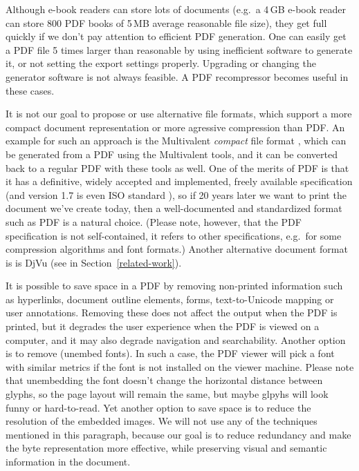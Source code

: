 \documentclass{ltugproc}
\begin{document}
Although e-book readers can store lots of documents (e.g.\ a 4\,GB e-book
reader can store 800 PDF books of 5\,MB average reasonable file size), they
get full quickly if we don't pay attention to efficient PDF generation. One
can easily get a PDF file 5 times larger than reasonable by using
inefficient software to generate it, or not setting the export settings
properly. Upgrading or changing the generator software is not always
feasible. A PDF recompressor becomes useful in these cases.

It is not our goal to propose or use
alternative file formats, which support a more
compact document representation or more agressive compression than PDF. An
example for such an approach is the Multivalent \emph{compact} file format
\cite{multivalent-compact}, which can be generated from a PDF using the
Multivalent tools, and it can be converted back to a regular PDF with these
tools as well. One of the merits of PDF is that it has a definitive, widely
accepted and implemented, freely available
specification \cite{pdfref} (and version 1.7 is
even ISO standard \cite{pdf-iso}), so if 20 years later we want to
print the document we've create today, then a well-documented and
standardized format such as PDF is a natural choice. (Please note, however,
that the PDF specification is not self-contained, it refers to other
specifications, e.g.\ for some compression algorithms and font formats.)
Another alternative document format is is DjVu (see in
Section~\ref{related-work}).

It is possible to save space in a PDF by removing non-printed information
such as hyperlinks, document outline elements, forms, text-to-Unicode
mapping or user annotations. Removing these does not affect the output when
the PDF is printed, but it degrades the user experience when the PDF is
viewed on a computer, and it may also degrade navigation and searchability.
Another option is to remove (unembed fonts). In such a case, the PDF viewer
will pick a font with similar metrics if the font is not installed on the
viewer machine. Please note that unembedding the font doesn't change the
horizontal distance between glyphs, so the page layout will remain the
same, but maybe glpyhs will look funny or hard-to-read. Yet another option
to save space is to reduce the resolution of the embedded images. We will
not use any of the techniques mentioned in this paragraph, because our goal
is to reduce redundancy and make the byte representation more effective,
while preserving visual and semantic information in the document.
\end{document}

